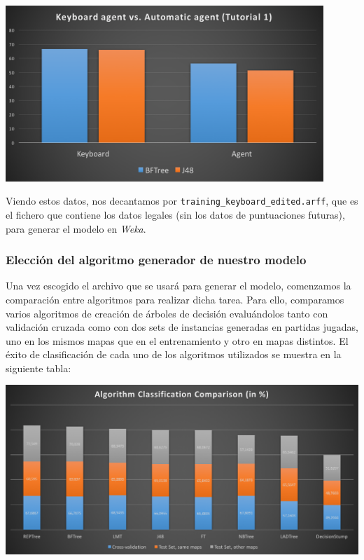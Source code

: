 \documentclass[12pt]{article}
\begin{document}
\begin{center} \includegraphics[width=12cm]{kb_vs_aa} \end{center}

Viendo estos datos, nos decantamos por \texttt{training\_keyboard\_edited.arff}, que es el fichero que contiene los datos legales (sin los datos de puntuaciones futuras), para generar el modelo en \emph{Weka}.

\newpage
\subsubsection{Elección del algoritmo generador de nuestro modelo}

Una vez escogido el archivo que se usará para generar el modelo, comenzamos la comparación entre algoritmos para realizar dicha tarea. Para ello, comparamos varios algoritmos de creación de árboles de decisión evaluándolos tanto con validación cruzada como con dos sets de instancias generadas en partidas jugadas, uno en los mismos mapas que en el entrenamiento y otro en mapas distintos. El éxito de clasificación de cada uno de los algoritmos utilizados se muestra en la siguiente tabla:

\vspace{0.2cm}

\noindent \includegraphics[width=\textwidth]{algorithm_comparison}
\end{document}
